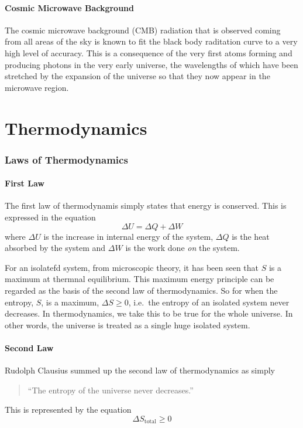 \documentclass[british]{article}
\begin{document}
\subsection{Cosmic Microwave Background}
The cosmic microwave background (CMB) radiation that is observed coming from all areas of the sky is known to fit the black body raditation curve to a very high level of accuracy. This is a consequence of the very first atoms forming and producing photons in the very early universe, the wavelengths of which have been stretched by the expansion of the universe so that they now appear in the microwave region.

\part{Thermodynamics}
\section{Laws of Thermodynamics}
\subsection{First Law}
The first law of thermodynamis simply states that energy is conserved. This is expressed in the equation
\[
\Delta U = \Delta Q + \Delta W
\]
where $\Delta U$ is the increase in internal energy of the system, $\Delta Q$ is the heat absorbed by the system and $\Delta W$ is the work done \emph{on} the system.

For an isolatefd system, from microscopic theory, it has been seen that $S$ is a maximum at thermnal equilibrium. This maximum energy principle can be regarded as the basis of the second law of thermodynamics. So for when the entropy, $S$, is a maximum,  $\Delta S \ge 0$, i.e.\ the entropy of an isolated system never decreases. In thermodynamics, we take this to be true for the whole universe. In other words, the universe is treated as a single huge isolated system.

\subsection{Second Law}
Rudolph Clausius summed up the second law of thermodynamics as simply
\begin{quote}
	``The entropy of the universe never decreases.''
\end{quote}
This is represented by the equation
\[
	\Delta S_{\text{total}} \ge 0
\]
\end{document}
